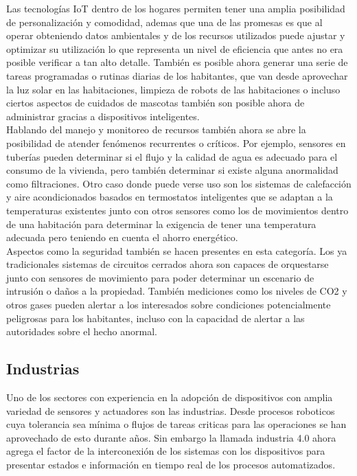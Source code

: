Las tecnologías IoT dentro de los hogares permiten tener una amplia posibilidad de personalización y comodidad, ademas que una de las promesas es que al operar obteniendo datos ambientales y de los recursos utilizados puede ajustar y optimizar su utilización lo que representa un nivel de eficiencia que antes no era posible verificar a tan alto detalle. También es posible ahora generar una serie de tareas programadas  o rutinas diarias de los habitantes, que van desde aprovechar la luz solar en las habitaciones, limpieza de robots de las habitaciones o incluso ciertos aspectos de cuidados de mascotas también son posible ahora de administrar gracias a dispositivos inteligentes.\\

Hablando del manejo y monitoreo de recursos también ahora se abre la posibilidad de atender fenómenos recurrentes o críticos. Por ejemplo, sensores en tuberías pueden determinar si el flujo y la calidad de agua es adecuado para el consumo de la vivienda, pero también determinar si existe alguna anormalidad como filtraciones. Otro caso donde puede verse uso son los sistemas de calefacción y aire acondicionados basados en termostatos inteligentes que se adaptan a la temperaturas existentes junto con otros sensores como los de movimientos dentro de una habitación para determinar la exigencia de tener una temperatura adecuada pero teniendo en cuenta el ahorro energético.\\ 

Aspectos como la seguridad también se hacen presentes en esta categoría. Los ya tradicionales sistemas de circuitos cerrados ahora son capaces de orquestarse junto con sensores de movimiento para poder determinar un escenario de intrusión o daños a la propiedad. También mediciones como los niveles de CO2 y otros gases pueden alertar a los interesados sobre condiciones potencialmente peligrosas para los habitantes, incluso con la capacidad de alertar a las autoridades sobre el hecho anormal. 

\subsection{Industrias}
Uno de los sectores con experiencia en la adopción de dispositivos con amplia variedad de sensores y actuadores son las industrias. Desde procesos roboticos cuya tolerancia sea mínima o flujos de tareas criticas para las operaciones  se han aprovechado de esto durante años. Sin embargo la llamada industria 4.0 ahora agrega el factor de la interconexión de los sistemas con los dispositivos para presentar estados e información en tiempo real de los procesos automatizados.\\

